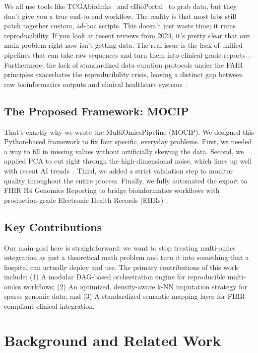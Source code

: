 \documentclass[12pt,a4paper,onecolumn]{article}
\begin{document}
We all use tools like TCGAbiolinks~\cite{colaprico2016} and cBioPortal~\cite{cerami2012} to grab data, but they don't give you a true end-to-end workflow. The reality is that most labs still patch together custom, ad-hoc scripts. This doesn't just waste time; it ruins reproducibility. If you look at recent reviews from 2024, it's pretty clear that our main problem right now isn't getting data. The real issue is the lack of unified pipelines that can take raw sequences and turn them into clinical-grade reports~\cite{abdelaziz2024multi,hernandez2024methods}. Furthermore, the lack of standardized data curation protocols under the FAIR principles exacerbates the reproducibility crisis, leaving a distinct gap between raw bioinformatics outputs and clinical healthcare systems~\cite{abdelaziz2024multi,hernandez2024methods,johnson2025standardizing}.

\subsection{The Proposed Framework: MOCIP}
That's exactly why we wrote the MultiOmicsPipeline (MOCIP). We designed this Python-based framework to fix four specific, everyday problems. First, we needed a way to fill in missing values without artificially skewing the data. Second, we applied PCA to cut right through the high-dimensional noise, which lines up well with recent AI trends~\cite{nam2024harnessing}. Third, we added a strict validation step to monitor quality throughout the entire process. Finally, we fully automated the export to FHIR R4 Genomics Reporting to bridge bioinformatics workflows with production-grade Electronic Health Records (EHRs)~\cite{mandel2016,smith2026fhir}.
 

\subsection{Key Contributions}
Our main goal here is straightforward: we want to stop treating multi-omics integration as just a theoretical math problem and turn it into something that a hospital can actually deploy and use. The primary contributions of this work include: (1) A modular DAG-based orchestration engine for reproducible multi-omics workflows; (2) An optimized, density-aware k-NN imputation strategy for sparse genomic data; and (3) A standardized semantic mapping layer for FHIR-compliant clinical integration.

\section{Background and Related Work}
\end{document}
